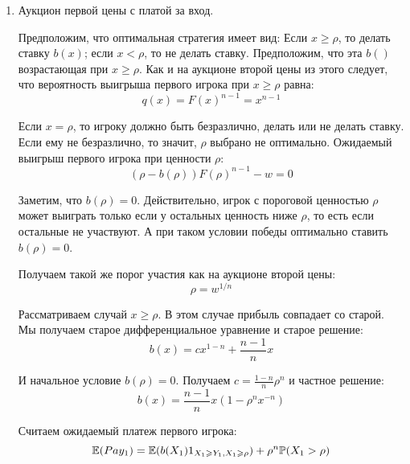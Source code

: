 \begin{enumerate}
\item Аукцион первой цены с платой за вход.

Предположим, что оптимальная стратегия имеет вид: Если $ x\geq \rho $, то делать ставку $ b(x) $; если $ x<\rho $, то не делать ставку. Предположим, что эта $ b() $ возрастающая при $ x\geq \rho $. Как и на аукционе второй цены из этого следует, что вероятность выигрыша первого игрока при $ x\geq\rho $ равна:
\begin{equation}
q(x)=F(x)^{n-1}=x^{n-1}
\end{equation}


Если $ x=\rho $, то игроку должно быть безразлично, делать или не делать ставку. Если ему не безразлично, то значит, $ \rho $ выбрано не оптимально. Ожидаемый выигрыш первого игрока при ценности $ \rho $:
\begin{equation}
(\rho-b(\rho))F(\rho)^{n-1}-w=0
\end{equation}

Заметим, что $ b(\rho)=0 $. Действительно, игрок с пороговой ценностью $ \rho $ может выиграть только если у остальных ценность ниже $ \rho $, то есть если остальные не участвуют. А при таком условии победы оптимально ставить $ b(\rho)=0 $.

Получаем такой же порог участия как на аукционе второй цены:
\begin{equation}
\rho=w^{1/n}
\end{equation}

Рассматриваем случай $ x\geq \rho $. В этом случае прибыль совпадает со старой. Мы получаем старое дифференциальное уравнение и старое решение:
\begin{equation}
b(x)=cx^{1-n}+\frac{n-1}{n}x
\end{equation}

И начальное условие $ b(\rho)=0 $. Получаем $ c=\frac{1-n}{n}\rho^{n} $ и частное решение:
\begin{equation}
b(x)=\frac{n-1}{n}x(1-\rho^{n}x^{-n})
\end{equation}

Считаем ожидаемый платеж первого игрока:
\begin{equation}
\mathbb{E}(Pay_{1})=\mathbb{E}(b(X_{1})1_{X_{1}\geqslant Y_{1},X_{1}\geqslant \rho})+\rho^{n}\mathbb{P}(X_{1}>\rho)
\end{equation}


\end{enumerate}
